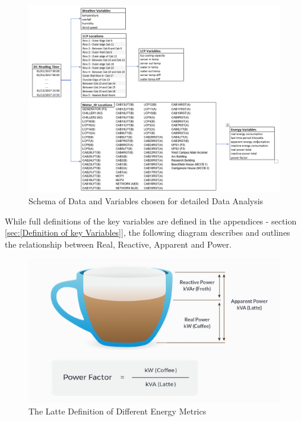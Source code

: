 \documentclass[12pt]{scrartcl}
\begin{document}
\begin{figure}[h]
  \caption{Schema of Data and Variables chosen for detailed Data Analysis}
  \label{fig:finalvariables}
  \centering
    \includegraphics[scale=0.40]{finalvariables}
\end{figure} 

While full definitions of the key variables are defined in the appendices - section \ref{sec:[Definition of key Variables]}, the following diagram describes and outlines the relationship between \gls{Real}, \gls{Reactive}, \gls{Apparent} and \gls{Power}. 

\begin{figure}[h]
  \caption{The Latte Definition of Different Energy Metrics}
  \label{fig:coffeeenergyanaliogy}
  \centering
    \includegraphics[scale=0.50]{power_explanation}
\end{figure} 
\end{document}
